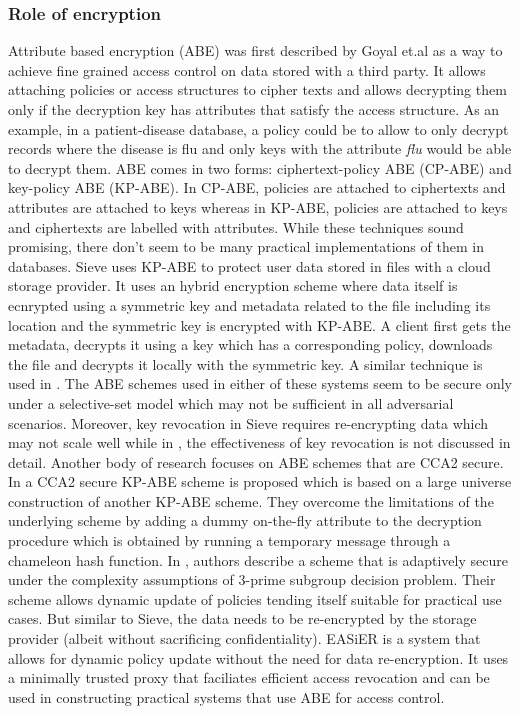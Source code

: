 \subsubsection{Role of encryption}
Attribute based encryption (\textsf{ABE}) \cite{abe} was first described by Goyal et.al as a way to achieve fine grained access control on data stored with a third party. It allows attaching policies or access structures to cipher texts and allows decrypting them only if the decryption key has attributes that satisfy the access structure. As an example, in a patient-disease database, a policy could be to allow to only decrypt records where the disease is flu and only keys with the attribute \textit{flu} would be able to decrypt them. \textsf{ABE} comes in two forms: ciphertext-policy ABE (\textsf{CP-ABE}) and key-policy ABE (\textsf{KP-ABE}). In \textsf{CP-ABE}, policies are attached to ciphertexts and attributes are attached to keys whereas in \textsf{KP-ABE}, policies are attached to keys and ciphertexts are labelled with attributes. While these techniques sound promising, there don't seem to be many practical implementations of them in databases. Sieve \cite{sieve} uses \textsf{KP-ABE} to protect user data stored in files with a cloud storage provider. It uses an hybrid encryption scheme where data itself is ecnrypted using a symmetric key and metadata related to the file including its location and the symmetric key is encrypted with \textsf{KP-ABE}. A client first gets the metadata, decrypts it using a key which has a corresponding policy, downloads the file and decrypts it locally with the symmetric key. A similar technique is used in \cite{PPEHR}. The \textsf{ABE} schemes used in either of these systems seem to be secure only under a \textsf{selective-set} model which  may not be sufficient in all adversarial scenarios. Moreover, key revocation in Sieve requires re-encrypting data which may not scale well while in \cite{PPEHR}, the effectiveness of key revocation is not discussed in detail.
\newline\newline
Another body of research focuses on \textsf{ABE} schemes that are \textsf{CCA2} secure. In \cite{cca2_abe1} a \textsf{CCA2} secure \textsf{KP-ABE} scheme is proposed which is based on a \textsf{large universe} construction of another \textsf{KP-ABE} scheme. They overcome the limitations of the underlying scheme by adding a dummy on-the-fly attribute to the decryption procedure which is obtained by running a temporary message through a \textsf{chameleon hash} function. In \cite{cca2_abe2}, authors describe a scheme that is adaptively secure under the complexity assumptions of 3-prime subgroup decision problem. Their scheme allows dynamic update of policies tending itself suitable for practical use cases. But similar to Sieve, the data needs to be re-encrypted by the storage provider (albeit without sacrificing confidentiality). EASiER \cite{easier} is a system that allows for dynamic policy update without the need for data re-encryption. It uses a minimally trusted proxy that faciliates efficient access revocation and can be used in constructing practical systems that use \textsf{ABE} for access control.
